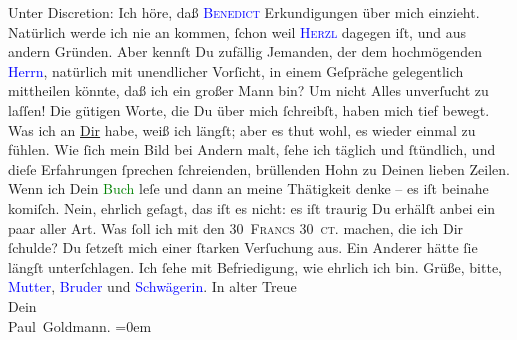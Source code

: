            \pstart
           Unter Discretion: Ich höre, daß \textsc{\textcolor{blue}{Benedict}{}\ledrightnote{\textcolor{blue}{Moriz Benedikt}}} Erkundigungen über mich einzieht. Natürlich werde ich nie an \label{K_L02622_9v}\label{K_L02622_9h} kommen, ſchon weil \textsc{\textcolor{blue}{Herzl}{}\ledrightnote{\textcolor{blue}{Theodor Herzl}}} dagegen iſt, und aus andern Gründen. Aber kennſt Du zufällig Jemanden, der dem
               hochmögenden \textcolor{blue}{Herrn}{}\ledrightnote{\textcolor{blue}{Moriz Benedikt}}, natürlich mit unendlicher
               Vorſicht, in einem Geſpräche gelegentlich mittheilen könnte, {\pb}daß ich ein großer Mann bin? Um nicht Alles
               unverſucht zu laſſen!\pend
           \pstart
           Die gütigen Worte, die Du über mich ſchreibſt, haben mich tief bewegt. Was ich an \uline{Dir} habe, weiß ich längſt; aber es thut wohl, es
               wieder einmal zu fühlen. Wie ſich mein Bild bei Andern malt, ſehe ich täglich und
               ſtündlich, und dieſe Erfahrungen ſprechen ſchreienden, brüllenden Hohn zu Deinen
               lieben Zeilen. Wenn ich  Dein \textcolor{green}{Buch}{} leſe und dann an meine Thätigkeit denke –
                  {\pb}es iſt beinahe komiſch. Nein, ehrlich geſagt,
               das iſt es nicht: es iſt traurig{\dotsfour}\pend
           \pstart
           Du erhälſt anbei ein paar \label{K_L02622_10v}\label{K_L02622_10h}
               aller Art.\pend
           \pstart
           Was ſoll ich mit den \textsc{30 Francs 30 ct.} machen, die ich Dir
               ſchulde? Du ſetzeſt mich einer ſtarken Verſuchung aus. Ein Anderer hätte ſie längſt
               unterſchlagen. Ich ſehe mit Befriedigung, wie  ehrlich ich bin.\pend
           \pstart
           Grüße, bitte, \textcolor{blue}{Mutter}{}, \textcolor{blue}{Bruder}{} und \textcolor{blue}{Schwägerin}{}.\pend
           \pstart
           In alter Treue{\\[\baselineskip]}Dein{\\[\baselineskip]}\spacefill\mbox{Paul Goldmann.}\pend
           \leftskip=0em{}\endnumbering{}\begin{anhang}\end{anhang}
      